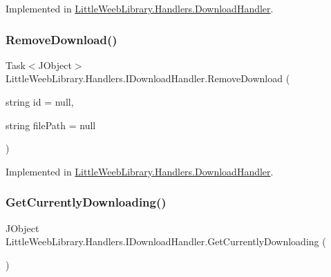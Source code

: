 Implemented in \mbox{\hyperlink{class_little_weeb_library_1_1_handlers_1_1_download_handler_a5a28664c89bf43b921fc9d3f1845b5a1}{Little\+Weeb\+Library.\+Handlers.\+Download\+Handler}}.

\mbox{\label{interface_little_weeb_library_1_1_handlers_1_1_i_download_handler_aca5dc8dc1965f09d2a5860f9297ddb26}} 
\subsubsection{\texorpdfstring{Remove\+Download()}{RemoveDownload()}}
{\footnotesize\ttfamily Task$<$J\+Object$>$ Little\+Weeb\+Library.\+Handlers.\+I\+Download\+Handler.\+Remove\+Download (\begin{DoxyParamCaption}\item[{string}]{id = {\ttfamily null},  }\item[{string}]{file\+Path = {\ttfamily null} }\end{DoxyParamCaption})}



Implemented in \mbox{\hyperlink{class_little_weeb_library_1_1_handlers_1_1_download_handler_aac22841386d098daef366cbe05262187}{Little\+Weeb\+Library.\+Handlers.\+Download\+Handler}}.

\mbox{\label{interface_little_weeb_library_1_1_handlers_1_1_i_download_handler_aa0c6f62ad21ef6fb638314101f4357ec}} 
\subsubsection{\texorpdfstring{Get\+Currently\+Downloading()}{GetCurrentlyDownloading()}}
{\footnotesize\ttfamily J\+Object Little\+Weeb\+Library.\+Handlers.\+I\+Download\+Handler.\+Get\+Currently\+Downloading (\begin{DoxyParamCaption}{ }\end{DoxyParamCaption})}




